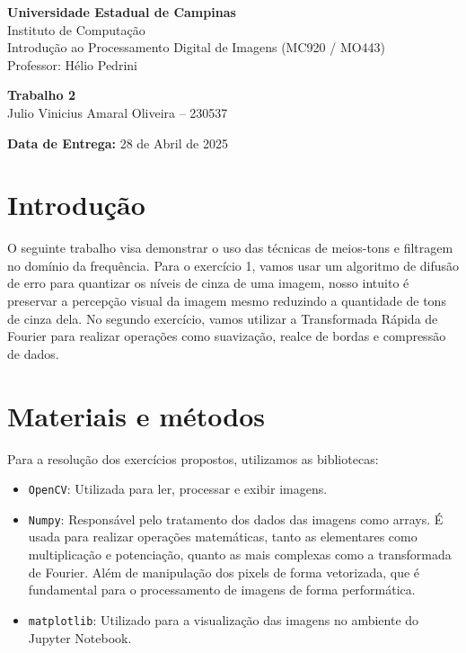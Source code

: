 \documentclass[12pt,a4paper]{article}
\begin{document}
\begin{center}
    \Large \textbf{Universidade Estadual de Campinas} \\
    \large Instituto de Computação \\
    \vspace{0.5cm}
    \large Introdução ao Processamento Digital de Imagens (MC920 / MO443) \\
    \large Professor: Hélio Pedrini
\end{center}

\vspace{2cm}

\begin{center}
    \LARGE \textbf{Trabalho 2} \\
    \vspace{0.5cm}
    \Large Julio Vinicius Amaral Oliveira – 230537
\end{center}

\vspace{2cm}

\begin{flushright}
    \large \textbf{Data de Entrega:} 28 de Abril de 2025
\end{flushright}

\newpage

\section*{Introdução}
O seguinte trabalho visa demonstrar o uso das técnicas de meios-tons e filtragem no domínio da frequência. Para o exercício 1, vamos usar um algoritmo de difusão de erro para quantizar os níveis de cinza de uma imagem, nosso intuito é preservar a percepção visual da imagem mesmo reduzindo a quantidade de tons de cinza dela. No segundo exercício, vamos utilizar a Transformada Rápida de Fourier para realizar operações como suavização, realce de bordas e compressão de dados. 

\section{Materiais e métodos}
Para a resolução dos exercícios propostos, utilizamos as bibliotecas:
\begin{itemize}
    \item \texttt{OpenCV}: Utilizada para ler, processar e exibir imagens.
    \item \texttt{Numpy}: Responsável pelo tratamento dos dados das imagens como arrays. É usada para realizar operações matemáticas, tanto as elementares como multiplicação e potenciação, quanto as mais complexas como a transformada de Fourier. Além de manipulação dos pixels de forma vetorizada, que é fundamental para o processamento de imagens de forma performática.
    \item \texttt{matplotlib}: Utilizado para a visualização das imagens no ambiente do Jupyter Notebook.
\end{itemize}
\end{document}
